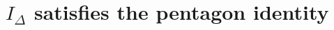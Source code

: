 \documentclass[12pt]{amsart}
\theoremstyle{definition}
\def\calT{\mathcal T}
\def\ID{I_{\Delta}}
\newcommand{\mb}{\mathbf}
\numberwithin{equation}{section}
\begin{document}
%
%


\appendix 

\section{$\ID$ satisfies the pentagon identity}
\label{sub.pentagon}
\end{document}
